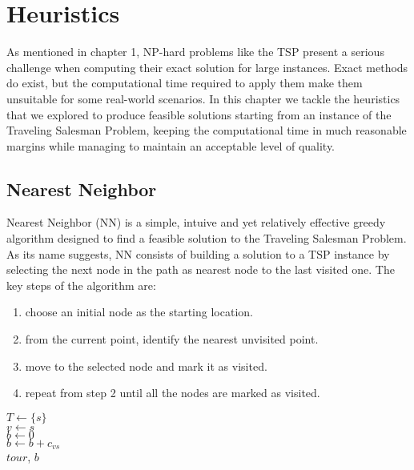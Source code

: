 \chapter{Heuristics}
As mentioned in chapter 1, NP-hard problems like the TSP present a serious challenge when computing their exact solution for large instances.
Exact methods do exist, but the computational time required to apply them make them unsuitable for some real-world scenarios.
In this chapter we tackle the heuristics that we explored to produce feasible solutions starting from an instance of the Traveling Salesman Problem,
keeping the computational time in much reasonable margins while managing to maintain an acceptable level of quality.


\section{Nearest Neighbor}

Nearest Neighbor (NN) is a simple, intuive and yet relatively effective greedy algorithm designed to find a feasible solution to the Traveling Salesman Problem.
As its name suggests, NN consists of building a solution to a TSP instance by selecting the next node in the path as nearest node to the last visited one.
The key steps of the algorithm are:
\begin{enumerate}
    \item choose an initial node as the starting location.
    \item from the current point, identify the nearest unvisited point.
    \item move to the selected node and mark it as visited.
    \item repeat from step 2 until all the nodes are marked as visited.
\end{enumerate}

\begin{algorithm}[htbp]
    \BlankLine
    $T \gets \{s\}$\\
    $v \gets s$\\
    $b \gets 0$\\
    $b \gets b + c_{vs}$\\
    \Return $tour$, $b$\\
\end{algorithm}

